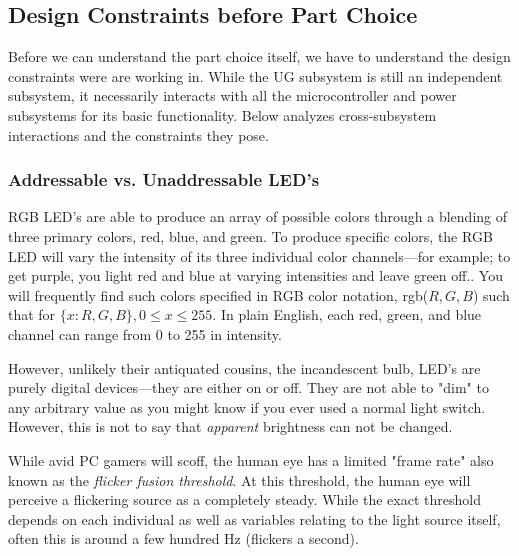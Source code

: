 \documentclass[11pt]{article}
\begin{document}
\subsection{Design Constraints before Part Choice}

Before we can understand the part choice itself, we have to understand the design constraints were are working in. While the UG subsystem is still an independent subsystem, it necessarily interacts with all the microcontroller and power subsystems for its basic functionality. Below analyzes cross-subsystem interactions and the constraints they pose.

\subsubsection{Addressable vs. Unaddressable LED's}


RGB LED's are able to produce an array of possible colors through a blending of three primary colors, red, blue, and green. To produce specific colors, the RGB LED will vary the intensity of its three individual color channels—for example; to get purple, you light red and blue at varying intensities and leave green off.\footnotemark {}. You will frequently find such colors specified in RGB color notation, rgb(\(R,G,B\)) such that for \(\{x: R,G,B\}, 0 \le x \le 255\). In plain English, each red, green, and blue channel can range from 0 to 255 in intensity.

However, unlikely their antiquated cousins, the incandescent bulb, LED's are purely digital devices—they are either on or off. They are not able to "dim" to any arbitrary value as you might know if you ever used a normal light switch. However, this is not to say that \emph{apparent} brightness can not be changed. 

While avid PC gamers will scoff, the human eye has a limited "frame rate"\footnotemark {} also known as the \emph{flicker fusion threshold}. At this threshold, the human eye will perceive a flickering source as a completely steady. While the exact threshold depends on each individual as well as variables relating to the light source itself, often this is around a few hundred Hz (flickers a second). 
\end{document}
